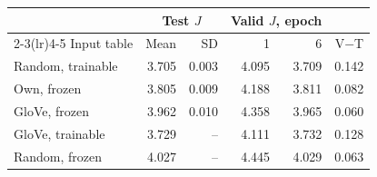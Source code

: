 \begin{tabular}{@{}lrrrrr@{}}
\toprule
 & \multicolumn{2}{c}{Test $J$} & \multicolumn{2}{c}{Valid $J$, epoch} & \\
\cmidrule(lr){2-3}\cmidrule(lr){4-5}
Input table & Mean & SD & 1 & 6 & V$-$T \\
\midrule
Random, trainable & 3.705 & 0.003 & 4.095 & 3.709 & 0.142 \\
Own, frozen & 3.805 & 0.009 & 4.188 & 3.811 & 0.082 \\
GloVe, frozen & 3.962 & 0.010 & 4.358 & 3.965 & 0.060 \\
GloVe, trainable & 3.729 & -- & 4.111 & 3.732 & 0.128 \\
Random, frozen & 4.027 & -- & 4.445 & 4.029 & 0.063 \\
\bottomrule
\end{tabular}
